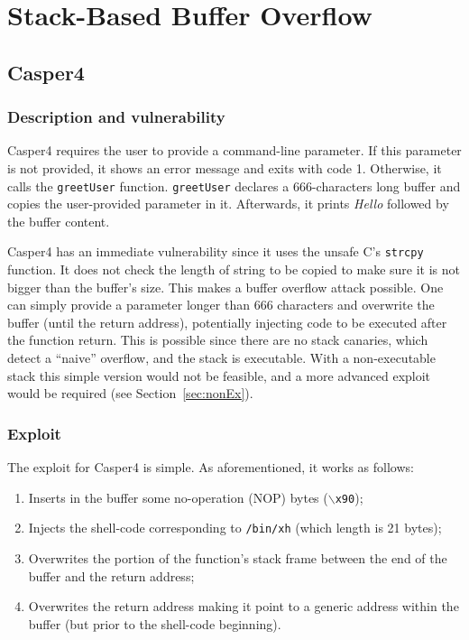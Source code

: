\section{Stack-Based Buffer Overflow}
\subsection{Casper4}\label{sec:casper4}
\subsubsection{Description and vulnerability}
Casper4 requires the user to provide a command-line parameter. If this parameter is not provided, it shows an error message and exits with code 1. Otherwise, it calls the \texttt{greetUser} function. \texttt{greetUser} declares a 666-characters long buffer and copies the user-provided parameter in it. Afterwards, it prints \textit{Hello} followed by the buffer content.

Casper4 has an immediate vulnerability since it uses the unsafe C's \texttt{strcpy} function. It does not check the length of string to be copied to make sure it is not bigger than the buffer's size. This makes a buffer overflow attack possible. One can simply provide a parameter longer than 666 characters and overwrite the buffer (until the return address), potentially injecting code to be executed after the function return. This is possible since there are no stack canaries, which detect a ``naive'' overflow, and the stack is executable. With a non-executable stack this simple version would not be feasible, and a more advanced exploit would be required (see Section~\ref{sec:nonEx}).

\subsubsection{Exploit}
The exploit for Casper4 is simple. As aforementioned, it works as follows:
\begin{enumerate}
	\item Inserts in the buffer some no-operation (NOP) bytes (\texttt{$\backslash$x90});
	\item Injects the shell-code corresponding to \texttt{/bin/xh} (which length is 21 bytes);
	\item Overwrites the portion of the function's stack frame between the end of the buffer and the return address;
	\item Overwrites the return address making it point to a generic address within the buffer (but prior to the shell-code beginning).
\end{enumerate}

